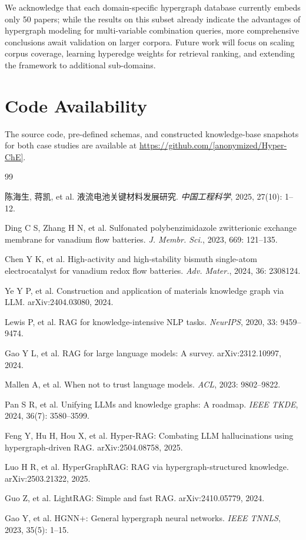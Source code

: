 \documentclass[11pt,a4paper]{article}
\begin{document}
We acknowledge that each domain-specific hypergraph database currently embeds only 50 papers; while the results on this subset already indicate the advantages of hypergraph modeling for multi-variable combination queries, more comprehensive conclusions await validation on larger corpora. Future work will focus on scaling corpus coverage, learning hyperedge weights for retrieval ranking, and extending the framework to additional sub-domains.

\section*{Code Availability}
\label{sec:code}

The source code, pre-defined schemas, and constructed knowledge-base snapshots for both case studies are available at \url{https://github.com/[anonymized/Hyper-ChE]}.


\begin{thebibliography}{99}

陈海生, 蒋凯, et al.
液流电池关键材料发展研究.
{\em 中国工程科学}, 2025, 27(10): 1--12.

Ding C S, Zhang H N, et al.
Sulfonated polybenzimidazole zwitterionic exchange membrane for vanadium flow batteries.
{\em J. Membr. Sci.}, 2023, 669: 121--135.

Chen Y K, et al.
High-activity and high-stability bismuth single-atom electrocatalyst for vanadium redox flow batteries.
{\em Adv. Mater.}, 2024, 36: 2308124.

Ye Y P, et al.
Construction and application of materials knowledge graph via LLM.
arXiv:2404.03080, 2024.

Lewis P, et al.
RAG for knowledge-intensive NLP tasks.
{\em NeurIPS}, 2020, 33: 9459--9474.

Gao Y L, et al.
RAG for large language models: A survey.
arXiv:2312.10997, 2024.

Mallen A, et al.
When not to trust language models.
{\em ACL}, 2023: 9802--9822.

Pan S R, et al.
Unifying LLMs and knowledge graphs: A roadmap.
{\em IEEE TKDE}, 2024, 36(7): 3580--3599.

Feng Y, Hu H, Hou X, et al.
Hyper-RAG: Combating LLM hallucinations using hypergraph-driven RAG.
arXiv:2504.08758, 2025.

Luo H R, et al.
HyperGraphRAG: RAG via hypergraph-structured knowledge.
arXiv:2503.21322, 2025.

Guo Z, et al.
LightRAG: Simple and fast RAG.
arXiv:2410.05779, 2024.

Gao Y, et al.
HGNN+: General hypergraph neural networks.
{\em IEEE TNNLS}, 2023, 35(5): 1--15.

\end{thebibliography}
\end{document}
